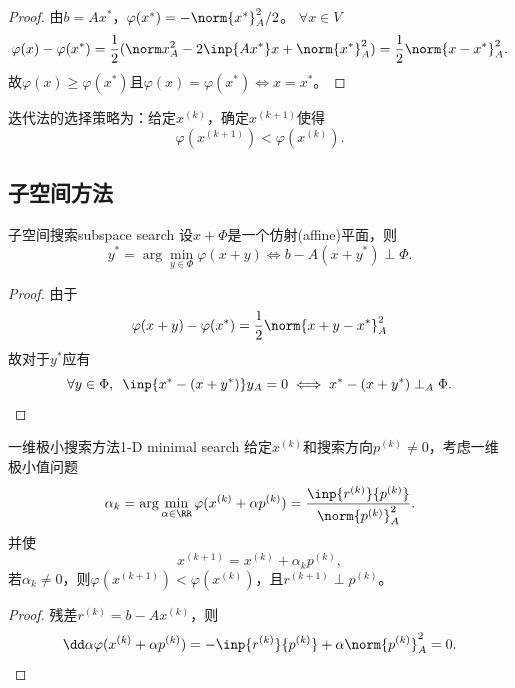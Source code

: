 \begin{proof}
    由$b=Ax^*$，$\varphi(x^*)=-\norm{x^*}_A^2/2$。
    $\forall x\in V$
    \[
        \varphi(x)-\varphi(x^*)=\frac12(\norm x_A^2-2\inp{Ax^*}x+\norm{x^*}_A^2)=\frac12\norm{x-x^*}^2_A.
    \]
    故$\varphi(x)\geq\varphi(x^*)$且$\varphi(x)=\varphi(x^*)\iff x=x^*$。
\end{proof}

\begin{corollary}
    迭代法的选择策略为：给定$x^{(k)}$，确定$x^{(k+1)}$使得
    \[
        \varphi(x^{(k+1)})<\varphi(x^{(k)}).
    \]
\end{corollary}

\subsection{子空间方法}
\label{ssec:subspace method}

\begin{theorem}
    {子空间搜索}{subspace search}
    设$x+\Phi$是一个仿射(affine)平面，则
    \[
        y^*=\arg\min_{y\in\Phi}\varphi(x+y)\iff 
        b-A(x+y^*)\perp\Phi.
    \]
\end{theorem}

\begin{proof}
    由于
    \[
        \varphi(x+y)-\varphi(x^*)=\frac12\norm{x+y-x^*}_A^2
    \]
    故对于$y^*$应有
    \[
        \forall y\in\Phi,\enspace\inp{x^*-(x+y^*)}y_A=0\iff
        x^*-(x+y^*)\perp_A\Phi.
        \qedhere
    \]
\end{proof}

\begin{theorem}
    {一维极小搜索方法}{1-D minimal search}
    给定$x^{(k)}$和搜索方向$p^{(k)}\neq 0$，考虑一维极小值问题
    \begin{equation}
        \label{eqn:alphak}
        \alpha_k=\arg\min_{\alpha\in\RR}\varphi(x^{(k)}+\alpha p^{(k)})=\frac{\inp{r^{(k)}}{p^{(k)}}}{\norm{p^{(k)}}_A^2}.
    \end{equation}
    并使
    \begin{equation}
        x^{(k+1)}=x^{(k)}+\alpha_kp^{(k)},
    \end{equation}
    若$\alpha_k\neq 0$，则$\varphi(x^{(k+1)})<\varphi(x^{(k)})$，且$r^{(k+1)}\perp p^{(k)}$。
\end{theorem}

\begin{proof}
    残差$r^{(k)}=b-Ax^{(k)}$，则
    \[
        \dd\alpha\varphi(x^{(k)}+\alpha p^{(k)})=-\inp{r^{(k)}}{p^{(k)}}+\alpha\norm{p^{(k)}}_A^2=0.
        \qedhere
    \]
\end{proof}

